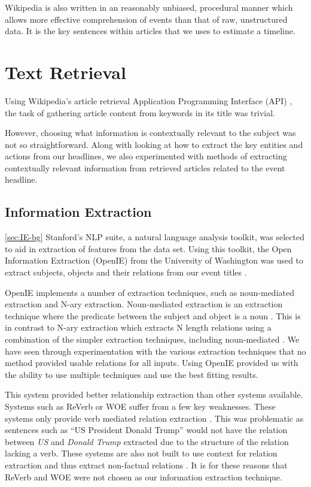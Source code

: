 \documentclass[bsc,frontabs,twoside,singlespacing,parskip,deptreport]{infthesis}     %
\begin{document}
Wikipedia is also written in an reasonably unbiased, procedural manner which allows more effective comprehension of events
than that of raw, unstructured data.
It is the key sentences within articles that we uses to estimate a timeline.

\section{Text Retrieval}\label{sec:retrieval}
Using Wikipedia's article retrieval Application Programming Interface (API) \cite{wikipediaAPI}, the task of gathering article content
from keywords in its title was trivial.

However, choosing what information is contextually relevant to the subject was not so straightforward.
Along with looking at how to extract the key entities and actions from our 
headlines, we also experimented with methods of extracting contextually relevant information from
retrieved articles related to the event headline.

\subsection{Information Extraction}\ref{sec:IE-bg}
Stanford's NLP suite,
a natural language analysis toolkit,
was selected to aid in extraction of features from the data set.
Using this toolkit, the Open Information Extraction (OpenIE) from
the University of Washington was used to extract subjects, objects
and their relations from our event titles \cite{schmitz2012open}.


OpenIE implements a number of extraction techniques, such as noun-mediated extraction and N-ary extraction.
Noun-mediated extraction is an extraction technique where the predicate between the subject and object is a noun \cite{mirrezaei2015triplex}.
This is in contrast to N-ary extraction which extracts N length relations using a combination of the simpler extraction techniques, including noun-mediated \cite{akbik2012kraken}. 
We have seen through experimentation with the various extraction techniques that no method provided
usable relations for all inputs. Using OpenIE provided us with the ability to use multiple techniques and
use the best fitting results.

This system provided better relationship extraction than other systems available. Systems such as
ReVerb\cite{fader2011identifying} or WOE\cite{wu2010open} suffer from a few key weaknesses. These systems only provide verb mediated relation extraction \cite{schmitz2012open}.
This was problematic as sentences such as ``US President Donald Trump'' would not have the relation between \textit{US} and \textit{Donald Trump} extracted due to the structure of the relation lacking a verb.
These systems are also not built to use context for relation extraction and thus extract non-factual relations \cite{schmitz2012open}.
It is for these reasons that ReVerb and WOE were not chosen as our information extraction technique.
\end{document}
